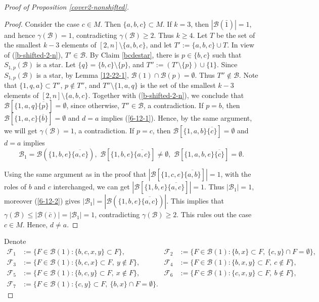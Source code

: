 \documentclass[a4paper,11pt]{article}
\newcommand{\m}{\mathcal}
\begin{document}
\begin{proof}[Proof of Proposition \ref{cover2-nonshifted}]
\begin{proof}
Consider the case $c\in M$. Then $\{a,b,c\}\subset M$. If $k=3$, then $|\m B(\bar1)|=1$, and hence $\gamma(\m B)=1$, contradicting $\gamma(\m B)\ge 2$. Thus $k\ge 4$.
Let $T$ be the set of the smallest $k-3$ elements of $[2,n]\setminus \{a,b,c\}$, and let $T':=\{a,b,c\}\cup T$. In view of (\ref{b-shifted-2-n}), $T'\in \m B$. 
By Claim \ref{bcdestar}, there is $p\in \{b,c\}$ such that $S_{1,p}(\m B)$ is a star. Let $\{q\}=\{b,c\}\setminus \{p\}$, and  $T'':=(T'\setminus \{p\})\cup \{1\}$. 
Since $S_{1,p}(\m B)$ is a star, by Lemma \ref{12-22-1}, $\m B(1)\cap \m B(p)=\emptyset$. Thus $T''\not\in \m B$. 
Note that $\{1,q,a\}\subset T''$, $p\not\in T''$, and $T''\setminus \{1,a,q\}$ is the set of the smallest $k-3$ elements of $[2,n]\setminus \{a,b,c\}$. Together with (\ref{b-shifted-2-n}),  we conclude that $\m B[\{1, a,q\}\overline{\{p\}}]=\emptyset$, since otherwise, $T''\in \m B$, a contradiction. 
If $p=b$, then $\m B[\{1,a,c\}\overline{\{b\}}]=\emptyset$ and $d=a$ implies (\ref{6-12-1}). Hence, by the same argument, we will get $\gamma(\m B)=1$, a contradiction.
If $p=c$, then $\m B[\{1,a,b\}\overline{\{c\}}]=\emptyset$ and $d=a$ implies
\begin{equation}\label{6-12-2}
\m B_1=\m B(\{1,b,e\}\overline{\{a, c\}}),\,\,\m B[\{1,b,e\}\overline{\{a,c\}}]\ne \emptyset, \,\,    \m B[\{1,a,b,e\}\overline{\{c\}}]= \emptyset.  
\end{equation}

Using the same argument as in the proof that $|\m B[\{1,c,e\}\overline{\{a,b\}}]|=1$, with the roles of $b$ and $c$ interchanged, we can get $|\m B[\{1,b,e\}\overline{\{a,c\}}]|=1$. Thus $|\m B_1|=1$, moreover (\ref{6-12-2}) gives $|\m B_1|=|\m B(\{1,b,e\}\overline{\{a, c\}})|$. This implies that $\gamma(\m B)\le  |\m B(\bar c)|=|\m B_1|=1$, contradicting $\gamma(\m B)\ge 2$. This rules out the case $c\in M$. Hence, $d\ne a$.
\end{proof}

Denote
\begin{align*}
\mathcal{F}_1 &:= \{F\in\mathcal{B}(1):\{b,c,x,y\}\subset F\}, &
\mathcal{F}_2 &:= \{F\in\mathcal{B}(1):\{b,x\}\subset F,\ \{c,y\}\cap F=\emptyset\}, \\[1pt]
\mathcal{F}_3 &:= \{F\in\mathcal{B}(1):\{b,c,x\}\subset F,\ y\notin F\}, &
\mathcal{F}_4 &:= \{F\in\mathcal{B}(1):\{b,x,y\}\subset F,\ c\notin F\}, \\[1pt]
\mathcal{F}_5 &:= \{F\in\mathcal{B}(1):\{b,c,y\}\subset F,\ x\notin F\}, &
\mathcal{F}_6 &:= \{F\in\mathcal{B}(1):\{c,x,y\}\subset F,\ b\notin F\}, \\[1pt]
\mathcal{F}_7 &:= \{F\in\mathcal{B}(1):\{c,y\}\subset F,\ \{b,x\}\cap F=\emptyset\}.
\end{align*}




\end{proof}
\end{document}
